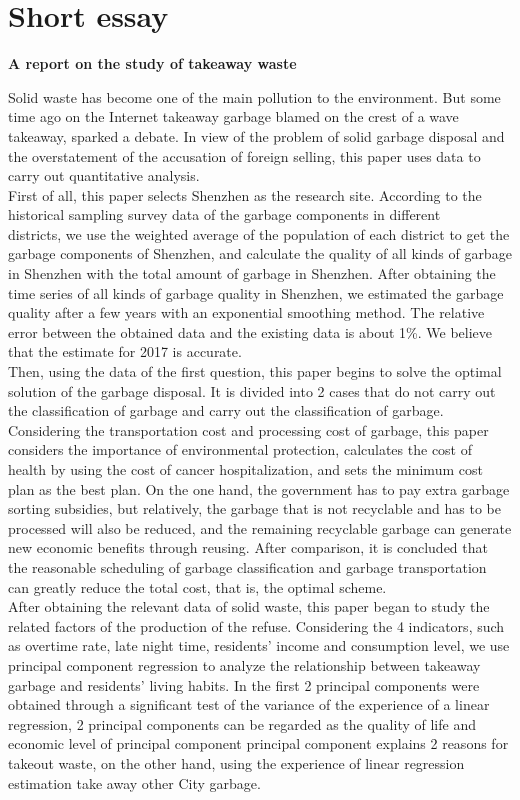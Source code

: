 \documentclass[UTF8]{article}
\begin{document}
\section{Short essay}
\begin{center}
\bf\large A report on the study of takeaway waste
\end{center}
\indent Solid waste has become one of the main pollution to the environment. But some time ago on the Internet takeaway garbage blamed on the crest of a wave takeaway, sparked a debate. In view of the problem of solid garbage disposal and the overstatement of the accusation of foreign selling, this paper uses data to carry out quantitative analysis. \\
\indent First of all, this paper selects Shenzhen as the research site. According to the historical sampling survey data of the garbage components in different\\
\indent  districts, we use the weighted average of the population of each district to get the garbage components of Shenzhen, and calculate the quality of all kinds of garbage in Shenzhen with the total amount of garbage in Shenzhen. After obtaining the time series of all kinds of garbage quality in Shenzhen, we estimated the garbage quality after a few years with an exponential smoothing method. The relative error between the obtained data and the existing data is about 1\%. We believe that the estimate for 2017 is accurate.\\
\indent Then, using the data of the first question, this paper begins to solve the optimal solution of the garbage disposal. It is divided into 2 cases that do not carry out the classification of garbage and carry out the classification of garbage. Considering the transportation cost and processing cost of garbage, this paper considers the importance of environmental protection, calculates the cost of health by using the cost of cancer hospitalization, and sets the minimum cost plan as the best plan. On the one hand, the government has to pay extra garbage sorting subsidies, but relatively, the garbage that is not recyclable and has to be processed will also be reduced, and the remaining recyclable garbage can generate new economic benefits through reusing. After comparison, it is concluded that the reasonable scheduling of garbage classification and garbage transportation can greatly reduce the total cost, that is, the optimal scheme.\\
\indent After obtaining the relevant data of solid waste, this paper began to study the related factors of the production of the refuse. Considering the 4 indicators, such as overtime rate, late night time, residents' income and consumption level, we use principal component regression to analyze the relationship between takeaway garbage and residents' living habits. In the first 2 principal components were obtained through a significant test of the variance of the experience of a linear regression, 2 principal components can be regarded as the quality of life and economic level of principal component principal component explains 2 reasons for takeout waste, on the other hand, using the experience of linear regression estimation take away other City garbage.\\
\end{document}
